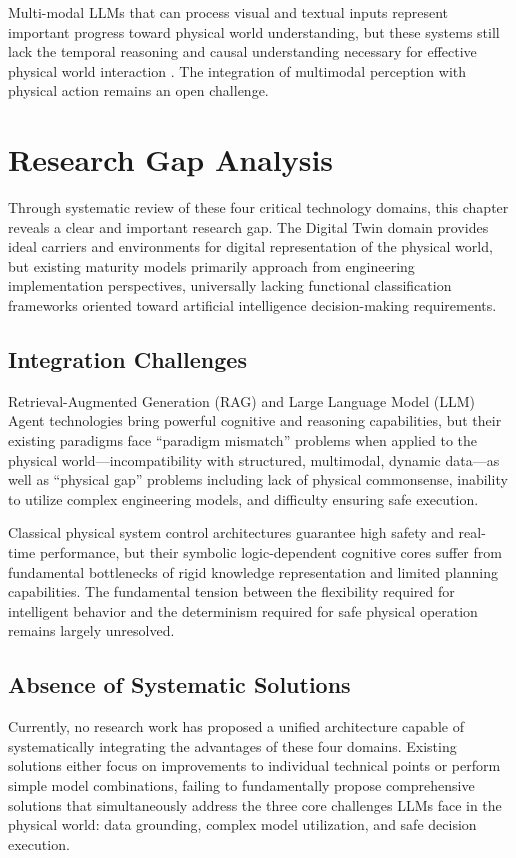 Multi-modal LLMs that can process visual and textual inputs represent important progress toward physical world understanding, but these systems still lack the temporal reasoning and causal understanding necessary for effective physical world interaction \cite{alayrac2022flamingo}. The integration of multimodal perception with physical action remains an open challenge.

\section{Research Gap Analysis}

Through systematic review of these four critical technology domains, this chapter reveals a clear and important research gap. The Digital Twin domain provides ideal carriers and environments for digital representation of the physical world, but existing maturity models primarily approach from engineering implementation perspectives, universally lacking functional classification frameworks oriented toward artificial intelligence decision-making requirements.

\subsection{Integration Challenges}

Retrieval-Augmented Generation (RAG) and Large Language Model (LLM) Agent technologies bring powerful cognitive and reasoning capabilities, but their existing paradigms face ``paradigm mismatch'' problems when applied to the physical world—incompatibility with structured, multimodal, dynamic data—as well as ``physical gap'' problems including lack of physical commonsense, inability to utilize complex engineering models, and difficulty ensuring safe execution.

Classical physical system control architectures guarantee high safety and real-time performance, but their symbolic logic-dependent cognitive cores suffer from fundamental bottlenecks of rigid knowledge representation and limited planning capabilities. The fundamental tension between the flexibility required for intelligent behavior and the determinism required for safe physical operation remains largely unresolved.

\subsection{Absence of Systematic Solutions}

Currently, no research work has proposed a unified architecture capable of systematically integrating the advantages of these four domains. Existing solutions either focus on improvements to individual technical points or perform simple model combinations, failing to fundamentally propose comprehensive solutions that simultaneously address the three core challenges LLMs face in the physical world: data grounding, complex model utilization, and safe decision execution.

